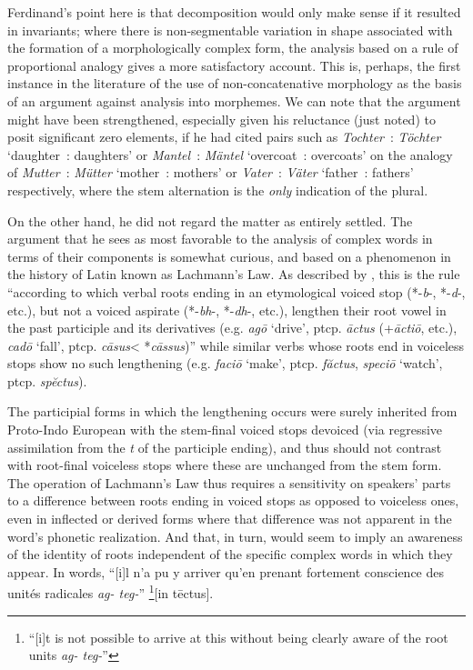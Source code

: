 \documentclass[output=paper]{langsci/langscibook}
\begin{document}
Ferdinand's point here is that decomposition would only make sense if
it resulted in invariants; where there is non-segmentable variation in
shape associated with the formation of a morphologically complex form,
the analysis based on a rule of proportional analogy gives a more
satisfactory account. This is, perhaps, the first instance in the
literature of the use of non-concatenative morphology as the basis of
an argument against analysis into morphemes. We can note that the
argument might have been strengthened, especially given his reluctance
(just noted) to posit significant zero elements, if he had cited pairs
such as \emph{Tochter}~: \emph{T\"ochter} `daughter~: daughters' or
\emph{Mantel}~: \emph{M\"antel} `overcoat~: overcoats' on the analogy
of \emph{Mutter}~: \emph{M\"utter} `mother~: mothers' or
\emph{Vater}~: \emph{V\"ater} `father~: fathers' respectively, where
the stem alternation is the \emph{only} indication of the plural.

On the other hand, he did not regard the matter as entirely
settled. The argument that he sees as most favorable to the analysis
of complex words in terms of their components
\citep[229--230]{saussure:cours} is somewhat curious, and based on a
phenomenon in the history of Latin known as Lachmann's Law. As
described by , this is the rule
``according to which verbal roots ending in an etymological voiced
stop (*-\emph{b}-, *-\emph{d}-, etc.), but not a voiced aspirate
(*-\emph{bh}-, *-\emph{dh}-, etc.), lengthen their root vowel in the
past participle and its derivatives (e.g. \emph{ag\=o} `drive',
ptcp. \emph{\=actus} (+\emph{\=acti\=o}, etc.), \emph{cad\=o} `fall',
ptcp. \emph{c\=asus}< *\emph{c\=assus})'' while similar verbs whose
roots end in voiceless stops show no such lengthening
(e.g. \emph{faci\=o} `make', ptcp. \emph{f\u{a}ctus}, \emph{speci\=o}
`watch', ptcp. \emph{sp\u{e}ctus}). 

The participial forms in which the lengthening occurs were surely
inherited from Proto-Indo European with the stem-final voiced stops
devoiced (via regressive assimilation from the \emph{t} of the
participle ending), and thus should not contrast with root-final
voiceless stops where these are unchanged from the stem form. The
operation of Lachmann's Law thus requires a sensitivity on speakers'
parts to a difference between roots ending in voiced stops as opposed
to voiceless ones, even in inflected or derived forms where that
difference was not apparent in the word's phonetic realization. And
that, in turn, would seem to imply an awareness of the identity of
roots independent of the specific complex words in which they appear.
In  words, ``[i]l n'a pu y arriver
qu'en prenant fortement conscience des unités radicales \emph{ag-
  teg-}'' \footnote{``[i]t is not possible to arrive at this without
  being clearly aware of the root units \emph{ag- teg-}''}{[in t\=ectus]}.
\end{document}
